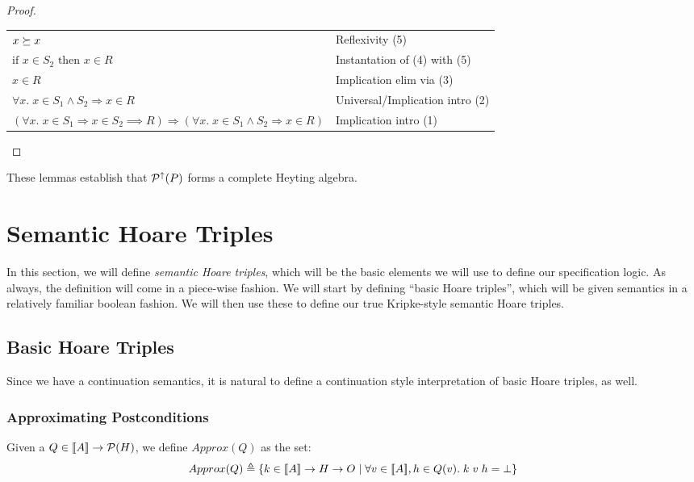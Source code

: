 \begin{proof}
\begin{tabular}{ll}
$x \succeq x$ & 
Reflexivity (5) \\

$\mbox{if } x \in S_2 \mbox{ then } x \in R$ & 
Instantation of (4) with (5) \\

$x \in R$ & 
Implication elim via (3) \\

$\forall x.\; x \in S_1 \land S_2 \Rightarrow x \in R$ & 
Universal/Implication intro (2) \\

$(\forall x.\; x \in S_1 \Rightarrow x \in S_2 \implies R) \Rightarrow (\forall x.\; x \in S_1 \land S_2 \Rightarrow x \in R)$ & 
Implication intro (1) \\
\end{tabular}
\end{proof}

These lemmas establish that $\mathcal{P}^{\uparrow}({P})$ forms a complete Heyting algebra. 

\section{Semantic Hoare Triples}

In this section, we will define \emph{semantic Hoare triples}, which will be the basic
elements we will use to define our specification logic. As always, the definition
will come in a piece-wise fashion. We will start by defining ``basic Hoare triples'',
which will be given semantics in a relatively familiar boolean fashion. We will then
use these to define our true Kripke-style semantic Hoare triples. 

\subsection{Basic Hoare Triples}

Since we have a continuation semantics, it is natural to define a
continuation style interpretation of basic Hoare triples, as well.

\subsubsection{Approximating Postconditions}

Given a $Q \in [\![{A}]\!] \to \mathcal{P}(H)$, we define $Approx(Q)$ as the set:
\begin{displaymath}
  Approx(Q) \triangleq \{{{k \in [\![{A}]\!] \to H \to O}\;|\;{\forall v \in [\![{A}]\!], h \in Q(v).\; k\;v\;h = \bot}}\}
\end{displaymath}

